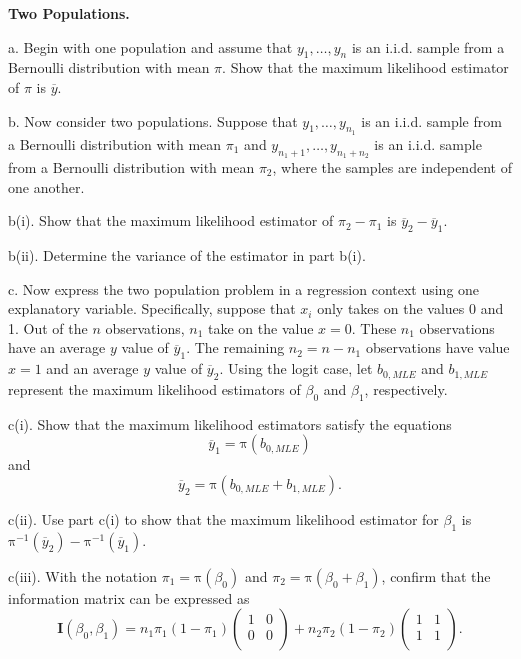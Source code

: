 \begin{exercises}
\item \textbf{Two Populations.}

a. Begin with one population and assume that $y_1, \ldots, y_n$ is
an i.i.d. sample from a Bernoulli distribution with mean $\pi$. Show
that the maximum likelihood estimator of $\pi$ is $\overline{y}$.

b. Now consider two populations. Suppose that $y_1, \ldots, y_{n_1}$
is an i.i.d. sample from a Bernoulli distribution with mean $\pi_1$
and $y_{n_1+1}, \ldots, y_{n_1+n_2}$ is an i.i.d. sample from a
Bernoulli distribution with mean $\pi_2$, where the samples are
independent of one another.

b(i). Show that the maximum likelihood estimator of $\pi_2 - \pi_1$
is $\overline{y}_2 - \overline{y}_1$.

b(ii). Determine the variance of the estimator in part b(i).


c. Now express the two population problem in a regression context
using one explanatory variable. Specifically, suppose that $x_i$
only takes on the values 0 and 1. Out of the $n$ observations, $n_1$
take on the value $x=0$. These $n_1 $ observations have an average
$y$ value of $\overline{y}_1$. The remaining $n_2 =n-n_1$
observations have value $x=1$ and an average $y$ value of
$\overline{y}_2$. Using the logit case, let $b_{0,MLE}$ and
$b_{1,MLE}$ represent the maximum likelihood estimators of $\beta_0$
and $\beta_1$, respectively.

c(i). Show that the maximum likelihood estimators satisfy the
equations
\begin{equation*}
\overline{y}_1 = \mathrm{\pi}\left(b_{0,MLE}\right)
\end{equation*}
and
\begin{equation*}
\overline{y}_2 = \mathrm{\pi}\left(b_{0,MLE}+b_{1,MLE}\right).
\end{equation*}

c(ii). Use part c(i) to show that the maximum likelihood estimator
for $\beta_1$ is
$\mathrm{\pi}^{-1}(\overline{y}_2)-\mathrm{\pi}^{-1}(\overline{y}_1)$.

c(iii). With the notation $\pi_1 = \mathrm{\pi}(\beta_0)$ and $\pi_2
= \mathrm{\pi}(\beta_0 +\beta_1)$, confirm that the information
matrix can be expressed as
\begin{equation*}
\mathbf{I}(\beta_0, \beta_1)  = n_1  \pi_1 (1-\pi_1) \left(
  \begin{array}{cc}
    1 & 0 \\
    0 & 0 \\
  \end{array}
\right) + n_2 \pi_2 (1-\pi_2) \left(
  \begin{array}{cc}
    1 & 1 \\
    1 & 1 \\
  \end{array}
\right).
\end{equation*}



\end{exercises}
